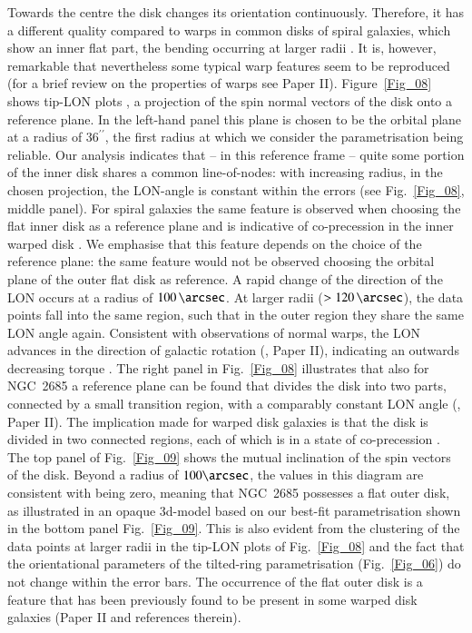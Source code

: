 \documentclass[oldversion]{aa}
\begin{document}
Towards the centre the  disk changes its orientation
continuously. Therefore, it has a different quality compared to warps
in common disks of spiral galaxies, which show an inner flat part, the
bending occurring at larger radii \citep[][]{Briggs90}. It is,
however, remarkable that nevertheless some typical warp features seem
to be reproduced (for a brief review on the properties of 
warps see Paper II). Figure~\ref{Fig_08} shows tip-LON plots
\citep[][]{Briggs90}, a projection of the spin normal vectors of the
disk onto a reference plane. In the left-hand panel this plane is
chosen to be the orbital plane at a radius of $36^{\prime\prime}$, the
first radius at which we consider the parametrisation being
reliable. Our analysis indicates that -- in this reference frame --
quite some portion of the inner disk shares a common line-of-nodes:
with increasing radius, in the chosen projection, the LON-angle is
constant within the errors (see Fig.~\ref{Fig_08}, middle panel). For
spiral galaxies the same feature is observed when choosing the flat
inner disk as a reference plane and is indicative of co-precession in
the inner warped disk \citep[][]{Briggs90}. We emphasise that this
feature depends on the choice of the reference plane: the same feature
would not be observed choosing the orbital plane of the outer flat
disk as reference. A rapid change of the direction of the LON occurs
at a radius of $100\,\arcsec$. At larger radii ($> 120\,\arcsec$), the
data points fall into the same region, such that in the outer region
they share the same LON angle again. Consistent with observations of
normal warps, the LON advances in the direction of galactic rotation
(\citealt{Briggs90}, Paper II), indicating an outwards decreasing
torque \citep[][]{Shen06}. The right panel in Fig.~\ref{Fig_08}
illustrates that also for NGC~2685 a reference plane can be found that
divides the  disk into two parts, connected by a small
transition region, with a comparably constant LON angle
(\citealt{Briggs90}, Paper II). The implication made for warped disk
galaxies is that the disk is divided in two connected regions, each of
which is in a state of co-precession \citep[][]{Revaz01}.  The top
panel of Fig.~\ref{Fig_09} shows the mutual inclination of the spin
vectors of the disk. Beyond a radius of $100\arcsec$, the values in
this diagram are consistent with being zero, meaning that NGC~2685
possesses a flat outer disk, as illustrated in an opaque 3d-model
based on our best-fit parametrisation shown in the bottom panel
Fig.~\ref{Fig_09}. This is also evident from the clustering of the
data points at larger radii in the tip-LON plots of Fig.~\ref{Fig_08}
and the fact that the orientational parameters of the tilted-ring
parametrisation (Fig.~\ref{Fig_06}) do not change within the error
bars. The occurrence of the flat outer disk is a feature that has been
previously found to be present in some warped disk galaxies (Paper II
and references therein).
\end{document}
